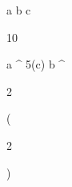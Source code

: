 \begin{eqcode}{\mu}{}{}{}
  a \in {} \lend
  b \in {} \lend
  c \gets
  \begin{tmatrix}
  10  \lend
  \end{tmatrix} \lend
   \lend
  a \gets \genar \limits ^ {5}(c) \lend
  b \gets \genar \limits ^ {  \begin{tmatrix}
  2  \lend
  \end{tmatrix} }( \begin{tmatrix}
  2  \lend
  \end{tmatrix})  \lend
   \lend
   \lend
   \lend
\end{eqcode}
